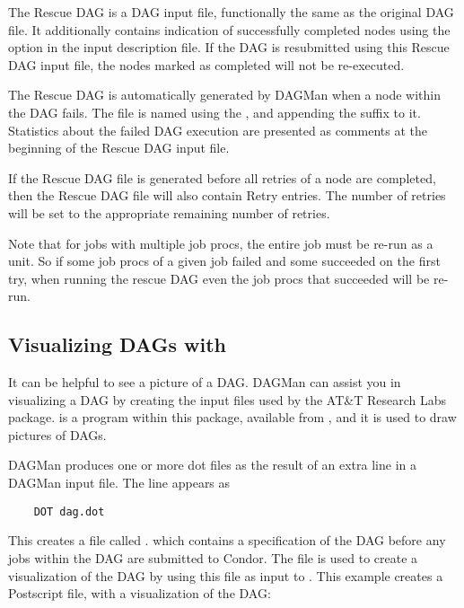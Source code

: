 The Rescue DAG is a DAG input file,
functionally the same as the original DAG file.
It additionally contains indication of
successfully completed nodes using the 
option in the input description file.
If the DAG is resubmitted using this Rescue DAG input file,
the nodes marked as completed will not be re-executed.

The Rescue DAG is automatically generated by DAGMan when a node
within the DAG fails.
The file is named using the , and appending
the suffix  to it.
Statistics about the failed DAG execution are presented as
comments at the beginning of the Rescue DAG input file.

If the Rescue DAG file is generated before all retries
of a node are completed, 
then the Rescue DAG file will also contain Retry entries.
The number of retries will be set to the appropriate remaining
number of retries. 

Note that for jobs with multiple job procs, the entire job must
be re-run as a unit.  So if some job procs of a given job failed
and some succeeded on the first try, when running the rescue DAG
even the job procs that succeeded will be re-run.



\subsection{Visualizing DAGs with }

It can be helpful to see a picture of a DAG.
DAGMan can assist you in visualizing a DAG by creating
the input files used by the AT\&T Research Labs 
 package. 
 is a program within this package,
available from ,
and it is used to draw pictures of DAGs. 

DAGMan produces one or more dot files as the result of
an extra line
in a DAGMan input file. 
The line appears as
\begin{verbatim}
    DOT dag.dot
\end{verbatim}

This creates a file called .
which contains
a specification of the DAG before any jobs within the DAG
are submitted to Condor.
The  file is used to create a visualization
of the DAG by using this file as input to .
This example creates a Postscript file, with a visualization of the DAG:

